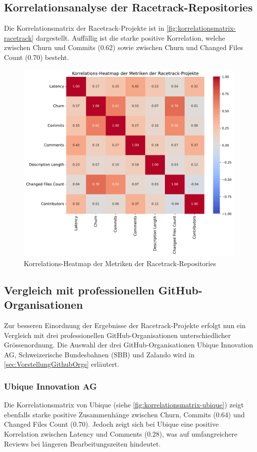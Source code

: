 \subsection{Korrelationsanalyse der Racetrack-Repositories}
Die Korrelationsmatrix der Racetrack-Projekte ist in \autoref{fig:korrelationsmatrix-racetrack} dargestellt. Auffällig ist die starke positive Korrelation, welche zwischen Churn und Commits (0.62) sowie zwischen Churn und Changed Files Count (0.70) besteht. 

\begin{figure}[htbp]
    \includegraphics[width=\textwidth]{Figures/racetrack-korrelationsmatrix.pdf}
    \caption{Korrelations-Heatmap der Metriken der Racetrack-Repositories}
    \label{fig:korrelationsmatrix-racetrack}
\end{figure}


\subsection{Vergleich mit professionellen GitHub-Organisationen}
Zur besseren Einordnung der Ergebnisse der Racetrack-Projekte erfolgt nun ein Vergleich mit drei professionellen GitHub-Organisationen unterschiedlicher Grössenordnung. Die Auswahl der drei GitHub-Organisationen Ubique Innovation AG, Schweizerische Bundesbahnen (SBB) und Zalando wird in \autoref{sec:VorstellungGithubOrgs} erläutert. 


\subsubsection{Ubique Innovation AG}
Die Korrelationsmatrix von Ubique (siehe 
\autoref{fig:korrelationsmatrix-ubique}) zeigt ebenfalls starke positive Zusammenhänge zwischen Churn, Commits (0.64) und Changed Files Count (0.70). Jedoch zeigt sich bei Ubique eine positive Korrelation zwischen Latency und Comments (0.28), was auf umfangreichere Reviews bei längeren Bearbeitungszeiten hindeutet.

